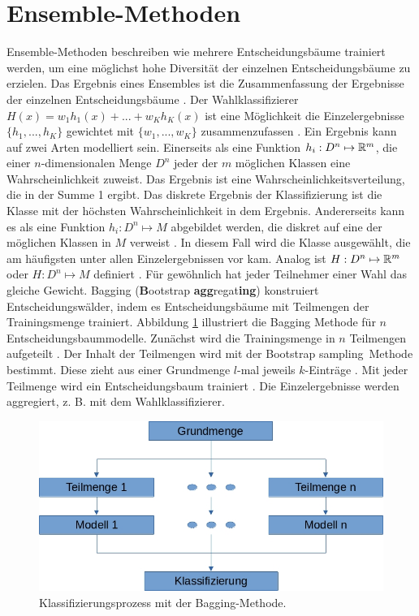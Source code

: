 \section{Ensemble-Methoden}
Ensemble-Methoden beschreiben wie mehrere Entscheidungsbäume trainiert werden, um eine möglichst hohe Diversität der einzelnen Entscheidungsbäume zu erzielen. Das Ergebnis eines Ensembles
ist die Zusammenfassung der Ergebnisse der einzelnen Entscheidungsbäume \cite{dietterich2002ensemble}.
\newline
\newline
Der Wahlklassifizierer $H(x) = w_1 h_1(x) + ... + w_K h_K(x)$ ist eine Möglichkeit die Einzelergebnisse $\{h_1, ..., h_K\}$ gewichtet mit $\{w_1, ..., w_K\}$ zusammenzufassen \cite{dietterich2002ensemble}.
Ein Ergebnis kann auf zwei Arten modelliert sein. Einerseits als eine Funktion $h_i: D^n \mapsto {\mathbb R}^m$, die einer $n$-dimensionalen Menge $D^n$ jeder der $m$ möglichen Klassen eine Wahrscheinlichkeit
zuweist. Das Ergebnis ist eine Wahrscheinlichkeitsverteilung, die in der Summe 1 ergibt. Das diskrete Ergebnis der Klassifizierung ist die Klasse mit der höchsten Wahrscheinlichkeit in dem Ergebnis.
Andererseits kann es als eine Funktion $h_i: D^n \mapsto M$ abgebildet werden, die diskret auf eine der möglichen Klassen in $M$ verweist \cite{dymelThesis}. In diesem Fall wird die Klasse ausgewählt, die am
häufigsten unter allen Einzelergebnissen vor kam. Analog ist $H: D^n \mapsto {\mathbb R}^m$ oder $H: D^n \mapsto M$ definiert \cite{dietterich2002ensemble}. Für gewöhnlich hat jeder Teilnehmer einer Wahl das gleiche Gewicht.
\newline
\newline
Bagging (\textbf{B}ootstrap \textbf{agg}regat\textbf{ing}) konstruiert Entscheidungswälder, indem es Entscheidungsbäume mit Teilmengen der Trainingsmenge trainiert.
Abbildung \ref{fig:bagging} illustriert die Bagging Methode für $n$ Entscheidungsbaummodelle. Zunächst wird die Trainingsmenge in $n$ Teilmengen aufgeteilt \cite{breiman1996bagging}.
Der Inhalt der Teilmengen wird mit der \glqq Bootstrap sampling\grqq\ Methode bestimmt. Diese zieht aus einer Grundmenge $l$-mal jeweils $k$-Einträge \cite{efron1992bootstrap}.
Mit jeder Teilmenge wird ein Entscheidungsbaum trainiert \cite{breiman1996bagging}. Die Einzelergebnisse werden aggregiert, z. B. mit dem Wahlklassifizierer.
\begin{figure}[h!]
    \centering
    \includegraphics[width=0.6\linewidth]{images/bagging.jpg}
    \caption{Klassifizierungsprozess mit der Bagging-Methode.}
    \label{fig:bagging}
\end{figure}
